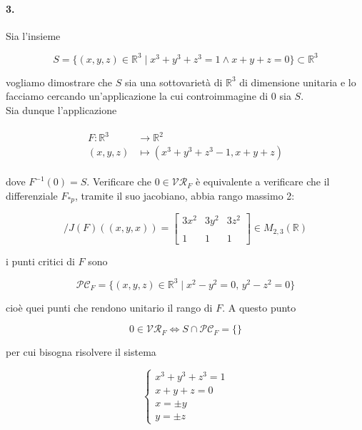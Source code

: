 \paragraph{3.}

Sia l'insieme

\begin{equation}
	S = \{ (x,y,z) \in \mathbb{R}^{3} \mid x^{3} + y^{3} + z^{3} = 1 \wedge x+y+z=0 \} \subset \mathbb{R}^{3}
\end{equation}

vogliamo dimostrare che $ S $ sia una sottovarietà di $ \mathbb{R}^{3} $ di dimensione unitaria e lo facciamo cercando un'applicazione la cui controimmagine di 0 sia $ S $.\\
Sia dunque l'applicazione

\begin{align}
	\begin{split}
		F : \mathbb{R}^{3} &\to \mathbb{R}^{2}\\
		(x,y,z) &\mapsto (x^{3}+y^{3}+z^{3}-1, x+y+z)
	\end{split}
\end{align}

dove $ F^{-1}(0) = S $. Verificare che $ 0 \in \mathcal{VR}_{F} $ è equivalente a verificare che il differenziale $ F_{*p} $, tramite il suo jacobiano, abbia rango massimo 2:

\begin{equation}/
	J(F)((x,y,x)) = \begin{bmatrix} 3x^{2} & 3y^{2} & 3z^{2} \\\\ 1 & 1 & 1 \end{bmatrix} \in M_{2,3}(\mathbb{R})
\end{equation}

i punti critici di $ F $ sono

\begin{equation}
	\mathcal{PC}_{F} = \{ (x,y,z) \in \mathbb{R}^{3} \mid x^{2}-y^{2}=0 , \, y^{2}-z^{2}=0 \}
\end{equation}

cioè quei punti che rendono unitario il rango di $ F $. A questo punto

\begin{equation}
	0 \in \mathcal{VR}_{F} \iff S \cap \mathcal{PC}_{F} = \{\}
\end{equation}

per cui bisogna risolvere il sistema

\begin{equation}
	\begin{cases}
		x^{3} + y^{3} + z^{3} = 1\\
		x+y+z=0\\
		x = \pm y\\
		y = \pm z
	\end{cases}
\end{equation}

